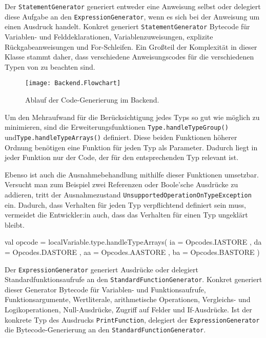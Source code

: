 Der \texttt{StatementGenerator} generiert entweder eine Anweisung selbst oder delegiert diese Aufgabe an den \texttt{ExpressionGenerator}, wenn es sich bei der Anweisung um einen Ausdruck handelt. Konkret generiert \texttt{StatementGenerator} Bytecode für Variablen- und Felddeklarationen, Variablenzuweisungen, explizite Rückgabeanweisungen und For-Schleifen. Ein Großteil der Komplexität in dieser Klasse stammt daher, dass verschiedene Anweisungscodes für die verschiedenen Typen von \toya zu beachten sind.

\begin{figure}[h]
    \caption{Ablauf der Code-Generierung im Backend.}
    \centering
    \texttt{[image: Backend.Flowchart]}
    \label{fig:backend-flowchart}
\end{figure}

Um den Mehraufwand für die Berücksichtigung jedes Typs so gut wie möglich zu minimieren, sind die Erweiterungsfunktionen \texttt{Type.handleTypeGroup()} und\break \texttt{Type.handleTypeArrays()} definiert. Diese beiden Funktionen höherer Ordnung benötigen eine Funktion für jeden Typ als Parameter. Dadurch liegt in jeder Funktion nur der Code, der für den entsprechenden Typ relevant ist.

Ebenso ist auch die Ausnahmebehandlung mithilfe dieser Funktionen umsetzbar. Versucht man zum Beispiel zwei Referenzen oder Boole'sche Ausdrücke zu addieren, tritt der Ausnahmezustand \texttt{UnsupportedOperationOnTypeException} ein. Dadurch, dass Verhalten für jeden Typ verpflichtend definiert sein muss, vermeidet die Entwickler:in auch, dass das Verhalten für einen Typ ungeklärt bleibt.

\begin{KotlinCode}[numbers=none, caption={Verwendung der Erweiterungsfunktion \texttt{Type.handleTypeArrays()}, um den richtigen Anweisungscode zum Speichern einer Variable zu ermitteln.}]
val opcode = localVariable.type.handleTypeArrays(
    ia = { Opcodes.IASTORE },
    da = { Opcodes.DASTORE },
    aa = { Opcodes.AASTORE },
    ba = { Opcodes.BASTORE }
)
\end{KotlinCode}

Der \texttt{ExpressionGenerator} generiert Ausdrücke oder delegiert Standardfunktionsaufrufe an den \texttt{StandardFunctionGenerator}. Konkret generiert dieser Generator Bytecode für Variablen- und Funktionsaufrufe, Funktionsargumente, Wertliterale, arithmetische Operationen, Vergleichs- und Logikoperationen, Null-Ausdrücke, Zugriff auf Felder und If-Ausdrücke. Ist der konkrete Typ des Ausdrucks \texttt{PrintFunction}, delegiert der \texttt{ExpressionGenerator} die Bytecode-Generierung an den \texttt{StandardFunctionGenerator}.

